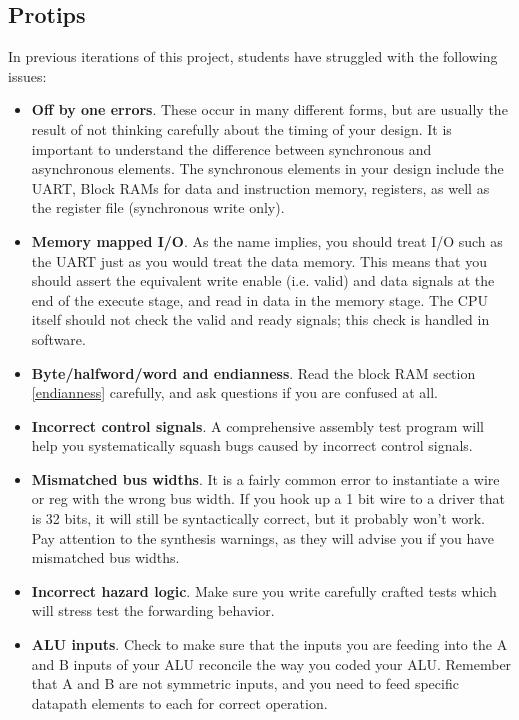 \documentclass[11pt]{article}
\begin{document}
\subsection{Protips}
In previous iterations of this project, students have struggled with the following issues:
\begin{itemize}
	\item \textbf{Off by one errors}. These occur in many different forms, but are usually the result of not thinking carefully about the timing of your design. It is important to understand the difference between synchronous and asynchronous elements. The synchronous elements in your design include the UART, Block RAMs for data and instruction memory, registers, as well as the register file (synchronous write only).
	
	\item \textbf{Memory mapped I/O}. As the name implies, you should treat I/O such as the UART just as you would treat the data memory. This means that you should assert the equivalent write enable (i.e. valid) and data signals at the end of the execute stage, and read in data in the memory stage. The CPU itself should not check the valid and ready signals; this check is handled in software.
	
	\item \textbf{Byte/halfword/word and endianness}. Read the block RAM section \ref{endianness} carefully, and ask questions if you are confused at all.
	
	\item \textbf{Incorrect control signals}. A comprehensive assembly test program will help you systematically squash bugs caused by incorrect control signals.
	
	\item \textbf{Mismatched bus widths}.  It is a fairly common error to instantiate a wire or reg with the wrong bus width. If you hook up a 1 bit wire to a driver that is 32 bits, it will still be syntactically correct, but it probably won’t work. Pay attention to the synthesis warnings, as they will advise you if you have mismatched bus widths.
	
	\item \textbf{Incorrect hazard logic}. Make sure you write carefully crafted tests which will stress test the forwarding behavior.
	
	\item \textbf{ALU inputs}. Check to make sure that the inputs you are feeding into the A and B inputs of your ALU reconcile the way you coded your ALU. Remember that A and B are not symmetric inputs, and you need to feed specific datapath elements to each for correct operation.
	

\end{itemize}
\end{document}
